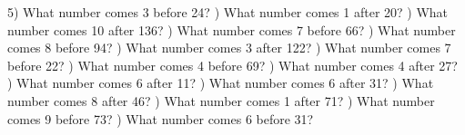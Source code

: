 \documentclass{article}%
\begin{document}
5) What number comes 3 before 24?%
\newline%
\newline%
) What number comes 1 after 20?%
\newline%
\newline%
) What number comes 10 after 136?%
\newline%
\newline%
) What number comes 7 before 66?%
\newline%
\newline%
) What number comes 8 before 94?%
\newline%
\newline%
) What number comes 3 after 122?%
\newline%
\newline%
) What number comes 7 before 22?%
\newline%
\newline%
) What number comes 4 before 69?%
\newline%
\newline%
) What number comes 4 after 27?%
\newline%
\newline%
) What number comes 6 after 11?%
\newline%
\newline%
) What number comes 6 after 31?%
\newline%
\newline%
) What number comes 8 after 46?%
\newline%
\newline%
) What number comes 1 after 71?%
\newline%
\newline%
) What number comes 9 before 73?%
\newline%
\newline%
) What number comes 6 before 31?%
\end{document}
